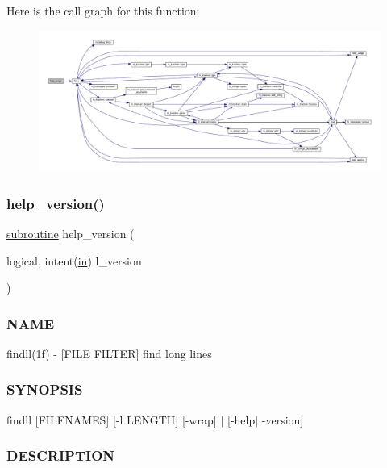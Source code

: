 Here is the call graph for this function\+:
\nopagebreak
\begin{figure}[H]
\begin{center}
\leavevmode
\includegraphics[width=350pt]{findll_8f90_a3e09a3b52ee8fb04eeb93fe5761626a8_cgraph}
\end{center}
\end{figure}
\mbox{\label{findll_8f90_a39c21619b08a3c22f19e2306efd7f766}} 
\subsubsection{\texorpdfstring{help\+\_\+version()}{help\_version()}}
{\footnotesize\ttfamily \hyperlink{M__stopwatch_83_8txt_acfbcff50169d691ff02d4a123ed70482}{subroutine} help\+\_\+version (\begin{DoxyParamCaption}\item[{logical, intent(\hyperlink{M__journal_83_8txt_afce72651d1eed785a2132bee863b2f38}{in})}]{l\+\_\+version }\end{DoxyParamCaption})}



\subsubsection*{N\+A\+ME}

findll(1f) -\/ \mbox{[}F\+I\+LE F\+I\+L\+T\+ER\mbox{]} find long lines \subsubsection*{S\+Y\+N\+O\+P\+S\+IS}

findll \mbox{[}F\+I\+L\+E\+N\+A\+M\+ES\mbox{]} \mbox{[}-\/l L\+E\+N\+G\+TH\mbox{]} \mbox{[}-\/wrap\mbox{]} $\vert$ \mbox{[}-\/help$\vert$ -\/version\mbox{]} \subsubsection*{D\+E\+S\+C\+R\+I\+P\+T\+I\+ON}

